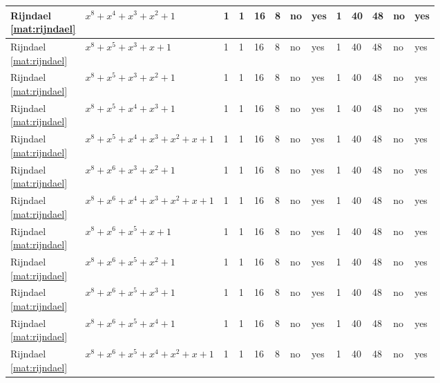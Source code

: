 \begin{tiny}
\begin{longtable}{|l|l|l|l|l|l|l|l|l|l|l|l|l|}
\shortstack{Rijndael \\ \eqref{mat:rijndael}} & $x^8 + x^4 + x^3 + x^2 + 1$ & 1 & 1 & 16 & 8 & no & yes & 1 & 40 & 48 & no & yes \\ \hline
\shortstack{Rijndael \\ \eqref{mat:rijndael}} & $x^8 + x^5 + x^3 + x + 1$ & 1 & 1 & 16 & 8 & no & yes & 1 & 40 & 48 & no & yes \\ \hline
\shortstack{Rijndael \\ \eqref{mat:rijndael}} & $x^8 + x^5 + x^3 + x^2 + 1$ & 1 & 1 & 16 & 8 & no & yes & 1 & 40 & 48 & no & yes \\ \hline
\shortstack{Rijndael \\ \eqref{mat:rijndael}} & $x^8 + x^5 + x^4 + x^3 + 1$ & 1 & 1 & 16 & 8 & no & yes & 1 & 40 & 48 & no & yes \\ \hline
\shortstack{Rijndael \\ \eqref{mat:rijndael}} & $x^8 + x^5 + x^4 + x^3 + x^2 + x + 1$ & 1 & 1 & 16 & 8 & no & yes & 1 & 40 & 48 & no & yes \\ \hline
\shortstack{Rijndael \\ \eqref{mat:rijndael}} & $x^8 + x^6 + x^3 + x^2 + 1$ & 1 & 1 & 16 & 8 & no & yes & 1 & 40 & 48 & no & yes \\ \hline
\shortstack{Rijndael \\ \eqref{mat:rijndael}} & $x^8 + x^6 + x^4 + x^3 + x^2 + x + 1$ & 1 & 1 & 16 & 8 & no & yes & 1 & 40 & 48 & no & yes \\ \hline
\shortstack{Rijndael \\ \eqref{mat:rijndael}} & $x^8 + x^6 + x^5 + x + 1$ & 1 & 1 & 16 & 8 & no & yes & 1 & 40 & 48 & no & yes \\ \hline
\shortstack{Rijndael \\ \eqref{mat:rijndael}} & $x^8 + x^6 + x^5 + x^2 + 1$ & 1 & 1 & 16 & 8 & no & yes & 1 & 40 & 48 & no & yes \\ \hline
\shortstack{Rijndael \\ \eqref{mat:rijndael}} & $x^8 + x^6 + x^5 + x^3 + 1$ & 1 & 1 & 16 & 8 & no & yes & 1 & 40 & 48 & no & yes \\ \hline
\shortstack{Rijndael \\ \eqref{mat:rijndael}} & $x^8 + x^6 + x^5 + x^4 + 1$ & 1 & 1 & 16 & 8 & no & yes & 1 & 40 & 48 & no & yes \\ \hline
\shortstack{Rijndael \\ \eqref{mat:rijndael}} & $x^8 + x^6 + x^5 + x^4 + x^2 + x + 1$ & 1 & 1 & 16 & 8 & no & yes & 1 & 40 & 48 & no & yes \\ \hline

\end{longtable}
\end{tiny}
